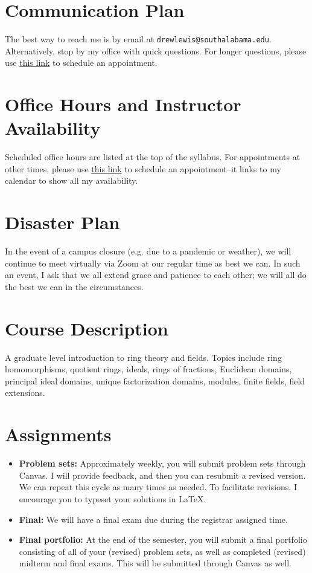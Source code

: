 \documentclass{article}
\begin{document}
\section*{\fontsize{12}{15}\selectfont Communication Plan}

The best way to reach me is by email at {\tt drewlewis@southalabama.edu}. Alternatively, stop by my office with quick questions. For longer questions, please use \href{https://calendly.com/dr-lewis}{this link} to schedule an appointment.

\section*{\fontsize{12}{15}\selectfont Office Hours and Instructor Availability}

Scheduled office hours are listed at the top of the syllabus. For appointments at other times, please use \href{https://calendly.com/dr-lewis}{this link} to schedule an appointment--it links to my calendar to show all my availability. 

\section*{\fontsize{12}{15}\selectfont Disaster Plan}
In the event of a campus closure (e.g. due to a pandemic or weather), we will continue to meet virtually via Zoom at our regular time as best we can. In such an event, I ask that we all extend grace and patience to each other; we will all do the best we can in the circumstances.


\section*{\fontsize{12}{15}\selectfont Course Description}
A graduate level introduction to ring theory and fields. Topics include ring homomorphisms, quotient rings, ideals, rings of fractions, Euclidean domains, principal ideal domains, unique factorization domains, modules, finite fields, field extensions.


\section*{\fontsize{12}{15}\selectfont Assignments}
\begin{itemize}
\item \textbf{Problem sets: } Approximately weekly, you will submit problem sets through Canvas.  I will provide feedback, and then you can resubmit a revised version. We can repeat this cycle as many times as needed. To facilitate revisions, I encourage you to typeset your solutions in \LaTeX.
\item \textbf{Final: } We will have a final exam due during the registrar assigned time.
\item \textbf{Final portfolio: } At the end of the semester, you will submit a final portfolio consisting of all of your (revised) problem sets, as well as completed (revised) midterm and final exams.  This will be submitted through Canvas as well.
\end{itemize}
\end{document}
